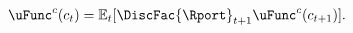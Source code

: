   \begin{equation}\begin{gathered}\begin{aligned}
        \uFunc^{c}(c_{t})  & = \Ex_{t}[\DiscFac {\Rport}_{t+1} \uFunc^{c}(c_{t+1})]. \label{eq:EulercRiskyR}
      \end{aligned}\end{gathered}\end{equation}
